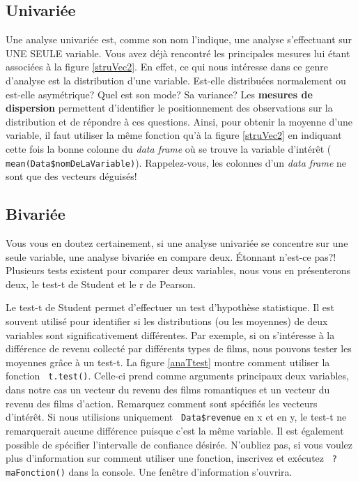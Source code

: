 \documentclass[10.5pt,a4paper]{article}
\newcommand{\rcode}[1]{\texttt{\color{rstudio} #1}}
\begin{document}
  \subsection{Univariée}
  Une analyse univariée est, comme son nom l'indique, une analyse s'effectuant sur UNE SEULE variable. Vous avez déjà rencontré les principales mesures lui étant associées à la figure \ref{struVec2}. En effet, ce qui nous intéresse dans ce genre d'analyse est la distribution d'une variable. Est-elle distribuées normalement ou est-elle asymétrique? Quel est son mode? Sa variance? Les \textbf{mesures de dispersion} permettent d'identifier le positionnement des observations sur la distribution et de répondre à ces questions. Ainsi, pour obtenir la moyenne d'une variable, il faut utiliser la même fonction qu'à la figure \ref{struVec2} en indiquant cette fois la bonne colonne du \emph{data frame} où se trouve la variable d'intérêt (\rcode{mean(Data\$nomDeLaVariable)}). Rappelez-vous, les colonnes d'un \emph{data frame} ne sont que des vecteurs déguisés!
  
  \subsection{Bivariée}
  Vous vous en doutez certainement, si une analyse univariée se concentre sur une seule variable, une analyse bivariée en compare deux. Étonnant n'est-ce pas?! Plusieurs tests existent pour comparer deux variables, nous vous en présenterons deux, le test-t de Student et le r de Pearson. 
  
  Le test-t de Student permet d'effectuer un test d'hypothèse statistique. Il est souvent utilisé pour identifier si les distributions (ou les moyennes) de deux variables sont significativement différentes. Par exemple, si on s'intéresse à la différence de revenu collecté par différents types de films, nous pouvons tester les moyennes grâce à un test-t. La figure \ref{anaTtest} montre comment utiliser la fonction \rcode{t.test()}. Celle-ci prend comme arguments principaux deux variables, dans notre cas un vecteur du revenu des films romantiques et un vecteur du revenu des films d'action. Remarquez comment sont spécifi\'es les vecteurs d'intérêt. Si nous utilisions uniquement \rcode{Data\$revenue} en x et en y, le test-t ne remarquerait aucune différence puisque c'est la même variable. Il est également possible de spécifier l'intervalle de confiance désirée. N'oubliez pas, si vous voulez plus d'information sur comment utiliser une fonction, inscrivez et exécutez \rcode{?maFonction()} dans la console. Une fenêtre d'information s'ouvrira. 
  
\end{document}
